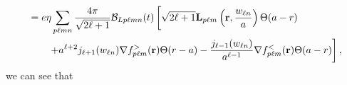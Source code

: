 \documentclass{article}
\begin{document}
\begin{equation}
\begin{split}
&= e\eta\sum_{p\ell mn}\frac{4\pi}{\sqrt{2\ell + 1}}\mathcal{B}_{Lp\ell mn}(t)\left[\sqrt{2\ell + 1}\mathbf{L}_{p\ell m}\left(\mathbf{r},\frac{w_{\ell n}}{a}\right)\Theta(a - r) \vphantom{\frac{j_{\ell + 1}(w_{\ell n})}{a^{\ell - 1}}} \right.\\
&\qquad\left. + a^{\ell + 2}j_{\ell + 1}(w_{\ell n})\nabla f_{p\ell m}^>(\mathbf{r})\Theta(r - a) - \frac{j_{\ell - 1}(w_{\ell n})}{a^{\ell - 1}}\nabla f_{p\ell m}^<(\mathbf{r})\Theta(a - r)\right],
\end{split}
\end{equation}
we can see that
\end{document}
